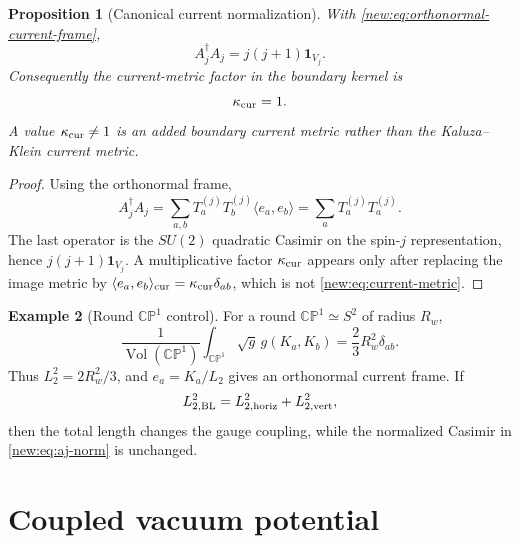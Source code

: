 \documentclass[11pt]{article}
\newcommand{\CP}{\mathbb{CP}}
\newcommand{\Vol}{\operatorname{Vol}}
\theoremstyle{plain}
\newtheorem{proposition}{Proposition}[section]
\theoremstyle{definition}
\newtheorem{example}[proposition]{Example}
\begin{document}
\begin{proposition}[Canonical current normalization]
\label{new:prop:canonical-current}
With \eqref{new:eq:orthonormal-current-frame},
\begin{equation}
  A_j^\dagger A_j=j(j+1)\mathbf 1_{V_j}.
  \label{new:eq:aj-norm}
\end{equation}
Consequently the current-metric factor in the boundary kernel is
\begin{equation}
  \kappa_{\rm cur}=1 .
  \label{new:eq:kappa-one}
\end{equation}
A value \(\kappa_{\rm cur}\ne1\) is an added boundary current metric rather than
the Kaluza--Klein current metric.
\end{proposition}

\begin{proof}
Using the orthonormal frame,
\[
  A_j^\dagger A_j
  =\sum_{a,b}T_a^{(j)}T_b^{(j)}\langle e_a,e_b\rangle
  =\sum_aT_a^{(j)}T_a^{(j)}.
\]
The last operator is the \(SU(2)\) quadratic Casimir on the spin-\(j\)
representation, hence \(j(j+1)\mathbf 1_{V_j}\).  A multiplicative factor
\(\kappa_{\rm cur}\) appears only after replacing the image metric by
\(\langle e_a,e_b\rangle_{\rm cur}=\kappa_{\rm cur}\delta_{ab}\), which is not
\eqref{new:eq:current-metric}.
\end{proof}

\begin{example}[Round \(\CP^1\) control]
\label{new:ex:cp1-control}
For a round \(\CP^1\simeq S^2\) of radius \(R_w\),
\[
  \frac{1}{\Vol(\CP^1)}\int_{\CP^1}\sqrt g\,g(K_a,K_b)
  =\frac{2}{3}R_w^2\delta_{ab}.
\]
Thus \(L_2^2=2R_w^2/3\), and \(e_a=K_a/L_2\) gives an orthonormal current
frame.  If
\[
  L_{2,{\rm BL}}^2=L_{2,{\rm horiz}}^2+L_{2,{\rm vert}}^2,
\]
then the total length changes the gauge coupling, while the normalized Casimir
in \eqref{new:eq:aj-norm} is unchanged.
\end{example}

\section{Coupled vacuum potential}
\label{new:sec:coupled-vacuum}
\end{document}
